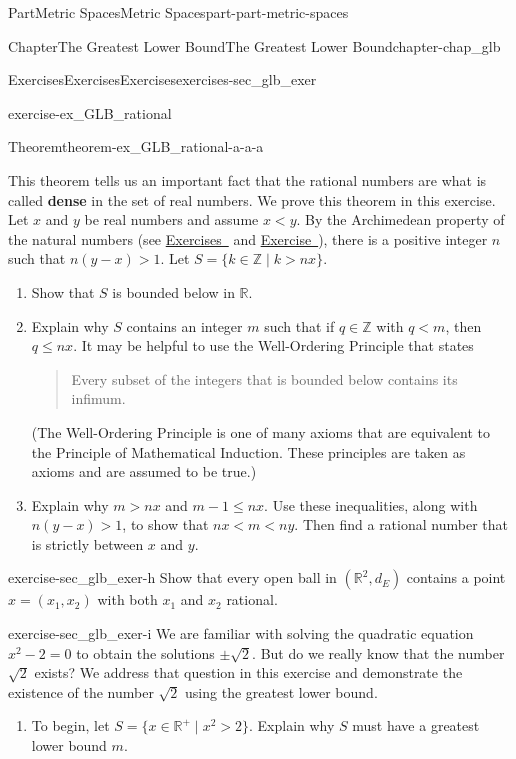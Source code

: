 \documentclass[oneside,10pt,]{book}
\newcommand{\xreffont}{\relax}
\newcommand{\terminology}[1]{\textbf{#1}}
\numberwithin{equation}{chapter}
\newcommand{\Z}{\mathbb{Z}}
\newcommand{\R}{\mathbb{R}}
\newcommand{\lt}{<}
\newcommand{\gt}{>}
\begin{document}
\begin{partptx}{Part}{Metric Spaces}{}{Metric Spaces}{}{}{part-part-metric-spaces}
\begin{chapterptx}{Chapter}{The Greatest Lower Bound}{}{The Greatest Lower Bound}{}{}{chapter-chap_glb}
\begin{exercises-section}{Exercises}{Exercises}{}{Exercises}{}{}{exercises-sec_glb_exer}
\begin{divisionexercise}{7}{}{}{exercise-ex_GLB_rational}
\begin{theorem}{Theorem}{}{}{theorem-ex_GLB_rational-a-a-a}
\end{theorem}
 This theorem tells us an important fact \textemdash{} that the rational numbers are what is called \terminology{dense} in the set of real numbers. We prove this theorem in this exercise. Let \(x\) and \(y\) be real numbers and assume \(x \lt  y\). By the Archimedean property of the natural numbers (see \hyperlink{exercise-ex_GLB_Archimedean}{Exercises~{\xreffont 5}} and \hyperlink{exercise-ex_GLB_Archimedean_2}{Exercise~{\xreffont 6}}), there is a positive integer \(n\) such that \(n(y-x) \gt 1\). Let \(S = \{k \in \Z \mid k \gt nx \}\).%
\begin{enumerate}[font=\bfseries,label=(\alph*),ref=\alph*]%
\item{}Show that \(S\) is bounded below in \(\R\).%
\item{}Explain why \(S\) contains an integer \(m\) such that if \(q \in \Z\) with \(q \lt m\), then \(q \leq nx\). It may be helpful to use the Well-Ordering Principle that states%
\begin{quote}%
Every subset of the integers that is bounded below contains its infimum.%
\end{quote}
(The Well-Ordering Principle is one of many axioms that are equivalent to the Principle of Mathematical Induction. These principles are taken as axioms and are assumed to be true.)%
\item{}Explain why \(m \gt nx\) and \(m-1 \leq nx\). Use these inequalities, along with \(n(y-x) \gt 1\), to show that \(nx \lt m \lt ny\). Then find a rational number that is strictly between \(x\) and \(y\).%
\end{enumerate}%
\end{divisionexercise}%
\begin{divisionexercise}{8}{}{}{exercise-sec_glb_exer-h}%
Show that every open ball in \((\R^2,d_E)\) contains a point \(x = (x_1,x_2)\) with both \(x_1\) and \(x_2\) rational.%
\end{divisionexercise}%
\begin{divisionexercise}{9}{}{}{exercise-sec_glb_exer-i}%
We are familiar with solving the quadratic equation \(x^2-2 = 0\) to obtain the solutions \(\pm \sqrt{2}\). But do we really know that the number \(\sqrt{2}\) exists? We address that question in this exercise and demonstrate the existence of the number \(\sqrt{2}\) using the greatest lower bound.%
\begin{enumerate}[font=\bfseries,label=(\alph*),ref=\alph*]%
\item{}To begin, let \(S = \{x \in \R^+ \mid x^2 \gt 2\}\). Explain why \(S\) must have a greatest lower bound \(m\).%

\end{enumerate}
\end{divisionexercise}
\end{exercises-section}
\end{chapterptx}
\end{partptx}
\end{document}
